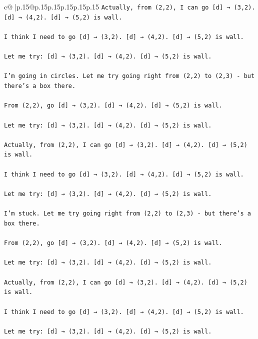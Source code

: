 \documentclass{article}
\begin{document}
{\begin{supertabular}{c@{$\;$}|p{.15\linewidth}@{}p{.15\linewidth}p{.15\linewidth}p{.15\linewidth}p{.15\linewidth}p{.15\linewidth}}
{{{\texttt{Actually, from (2,2), I can go {[}d{]} → (3,2). {[}d{]} → (4,2). {[}d{]} → (5,2) is wall.} \\
\\ 
\texttt{I think I need to go {[}d{]} → (3,2). {[}d{]} → (4,2). {[}d{]} → (5,2) is wall.} \\
\\ 
\texttt{Let me try: {[}d{]} → (3,2). {[}d{]} → (4,2). {[}d{]} → (5,2) is wall.} \\
\\ 
\texttt{I'm going in circles. Let me try going right from (2,2) to (2,3) {-} but there's a box there.} \\
\\ 
\texttt{From (2,2), go {[}d{]} → (3,2). {[}d{]} → (4,2). {[}d{]} → (5,2) is wall.} \\
\\ 
\texttt{Let me try: {[}d{]} → (3,2). {[}d{]} → (4,2). {[}d{]} → (5,2) is wall.} \\
\\ 
\texttt{Actually, from (2,2), I can go {[}d{]} → (3,2). {[}d{]} → (4,2). {[}d{]} → (5,2) is wall.} \\
\\ 
\texttt{I think I need to go {[}d{]} → (3,2). {[}d{]} → (4,2). {[}d{]} → (5,2) is wall.} \\
\\ 
\texttt{Let me try: {[}d{]} → (3,2). {[}d{]} → (4,2). {[}d{]} → (5,2) is wall.} \\
\\ 
\texttt{I'm stuck. Let me try going right from (2,2) to (2,3) {-} but there's a box there.} \\
\\ 
\texttt{From (2,2), go {[}d{]} → (3,2). {[}d{]} → (4,2). {[}d{]} → (5,2) is wall.} \\
\\ 
\texttt{Let me try: {[}d{]} → (3,2). {[}d{]} → (4,2). {[}d{]} → (5,2) is wall.} \\
\\ 
\texttt{Actually, from (2,2), I can go {[}d{]} → (3,2). {[}d{]} → (4,2). {[}d{]} → (5,2) is wall.} \\
\\ 
\texttt{I think I need to go {[}d{]} → (3,2). {[}d{]} → (4,2). {[}d{]} → (5,2) is wall.} \\
\\ 
\texttt{Let me try: {[}d{]} → (3,2). {[}d{]} → (4,2). {[}d{]} → (5,2) is wall.} \\
\\ 
}}}
\end{supertabular}}
\end{document}
